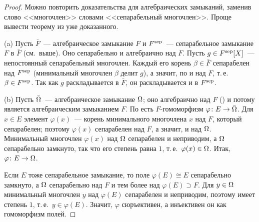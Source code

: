 \begin{proof}
Можно повторить доказательства для алгебраических замыканий, заменив слово <<многочлен>> словами <<сепарабельный
многочлен>>. Проще вывести теорему из уже доказанного.

(a) Пусть $\bar F$~--- алгебраическое замыкание $F$ и $F^{\mathrm{sep}}$~--- сепарабельное замыкание $F$ в $\bar F$ (см.~выше).
Оно сепарабельно и алгебраично над $F$. Пусть $g\in F^{\mathrm{sep}}[X]$~--- непостоянный сепарабельный многочлен. Каждый его
корень $\beta\in\bar F$ сепарабелен над $F^{\mathrm{sep}}$ (минимальный многочлен $\beta$ делит $g$), а значит, по  и над $F$,
т.\,е.\ $\beta\in F^{\mathrm{sep}}$. Так как $g$ раскладывается в $\bar F$, он раскладывается и в $F^{\mathrm{sep}}$.

(b) Пусть $\bar{\Omega}$~--- алгебраическое замыкание $\Omega$; оно алгебраично над $F$ () и потому является
алгебраическим замыканием $F$. По  есть $F$-гомоморфизм $\varphi\colon E\to\bar{\Omega}$. Для $x\in E$ элемент
$\varphi(x)$~--- корень минимального многочлена $x$ над $F$, который сепарабелен; поэтому $\varphi(x)$ сепарабелен над
$F$, а значит, и над $\Omega$. Минимальный многочлен $\varphi(x)$ над $\Omega$ сепарабелен и неприводим, а $\Omega$
сепарабельно замкнуто, так что его степень равна $1$, т.\,е.\ $\varphi(x)\in\Omega$. Итак, $\varphi\colon E\to\Omega$.

Если $E$ тоже сепарабельное замыкание, то поле $\varphi(E)\cong E$ сепарабельно замкнуто, а $\Omega$ сепарабельно над
$F$ и тем более над $\varphi(E)\supset F$. Для $y\in\Omega$ минимальный многочлен $y$ над $\varphi(E)$ сепарабелен и
неприводим, поэтому имеет степень $1$, т.\,е.\ $y\in\varphi(E)$. Значит, $\varphi$ сюръективен, а инъективен он как
гомоморфизм полей.
\end{proof}

\begin{center}
\end{center}

